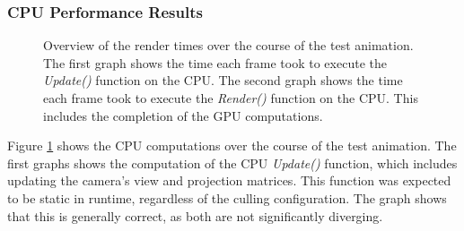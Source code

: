 \subsubsection*{CPU Performance Results} \label{subsubsec-cpu-performance-results-lucy}

\begin{figure}[!htb]              %
  \begin{center}
    \caption{Overview of the render times over the course of the test animation. The first graph shows the time 
    each frame took to execute the \emph{Update()} function on the \ac{CPU}. The second graph shows the time each 
    frame took to execute the \emph{Render()} function on the \ac{CPU}. This includes the completion of the 
    \ac{GPU} computations.}
    \label{plt:lucy-256-culling-cpu-time}
  \end{center}
\end{figure}

\noindent
Figure \ref{plt:lucy-256-culling-cpu-time} shows the \ac{CPU} computations over the course of the test animation.
The first graphs shows the computation of the \ac{CPU} \emph{Update()} function, which includes updating the camera's 
view and projection matrices. This function was expected to be static in runtime, regardless of the culling configuration. 
The graph shows that this is generally correct, as both are not significantly diverging.\\

